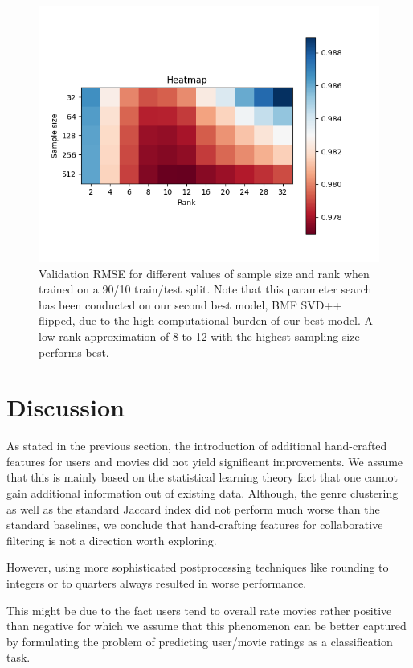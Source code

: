 \documentclass[10pt,conference,compsocconf]{IEEEtran}
\begin{document}
    \begin{figure}
        \includegraphics[width=\columnwidth]{figures/heatmap.png}
        \caption{Validation RMSE for different values of sample size and rank when trained on a 90/10 train/test split. Note that this parameter search has been conducted on our second best model, BMF SVD++ flipped, due to the high computational burden of our best model.
        A low-rank approximation of 8 to 12 with the highest sampling size performs best.}
        \label{fig:Heatmap}
    \end{figure}


    \section{Discussion}
    As stated in the previous section, the introduction of additional hand-crafted features for users and movies did not yield significant improvements.
    We assume that this is mainly based on the statistical learning theory fact that one cannot gain additional information out of existing data.
    Although, the genre clustering as well as the standard Jaccard index did not perform much worse than the standard baselines, we conclude that hand-crafting features for collaborative filtering is not a direction worth exploring.

    However, using more sophisticated postprocessing techniques like rounding to integers or to quarters always resulted in worse performance.

    This might be due to the fact users tend to overall rate movies rather positive than negative for which we assume that this phenomenon can be better captured by formulating the problem of predicting user/movie ratings as a classification task.
\end{document}
